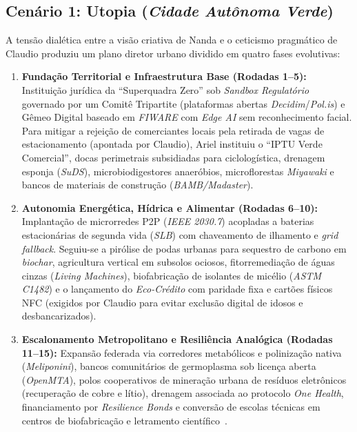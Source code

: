 \documentclass[runningheads]{llncs}
\begin{document}
\subsection{Cen\'ario 1: Utopia (\emph{Cidade Aut\^onoma Verde})}
A tens\~ao dial\'etica entre a vis\~ao criativa de Nanda e o ceticismo pragm\'atico de Claudio produziu um plano diretor urbano dividido em quatro fases evolutivas:

\begin{enumerate}
    \item \textbf{Funda\c{c}\~ao Territorial e Infraestrutura Base (Rodadas 1--5):} Instituição jur\'idica da ``Superquadra Zero'' sob \emph{Sandbox Regulat\'orio} governado por um Comit\^e Tripartite (plataformas abertas \emph{Decidim}/\emph{Pol.is}) e G\^emeo Digital baseado em \emph{FIWARE} com \emph{Edge AI} sem reconhecimento facial. Para mitigar a rejei\c{c}\~ao de comerciantes locais pela retirada de vagas de estacionamento (apontada por Claudio), Ariel instituiu o ``IPTU Verde Comercial'', docas perimetrais subsidiadas para ciclolog\'istica, drenagem esponja (\emph{SuDS}), microbiodigestores anaer\'obios, microflorestas \emph{Miyawaki} e bancos de materiais de constru\c{c}\~ao (\emph{BAMB/Madaster}).
    \item \textbf{Autonomia Energ\'etica, H\'idrica e Alimentar (Rodadas 6--10):} Implanta\c{c}\~ao de microrredes P2P (\emph{IEEE 2030.7}) acopladas a baterias estacion\'arias de segunda vida (\emph{SLB}) com chaveamento de ilhamento e \emph{grid fallback}. Seguiu-se a pir\'olise de podas urbanas para sequestro de carbono em \emph{biochar}, agricultura vertical em subsolos ociosos, fitorremedia\c{c}\~ao de \'aguas cinzas (\emph{Living Machines}), biofabrica\c{c}\~ao de isolantes de mic\'elio (\emph{ASTM C1482}) e o lan\c{c}amento do \emph{Eco-Cr\'edito} com paridade fixa e cart\~oes f\'isicos NFC (exigidos por Claudio para evitar exclus\~ao digital de idosos e desbancarizados).
    \item \textbf{Escalonamento Metropolitano e Resili\^encia Anal\'ogica (Rodadas 11--15):} Expans\~ao federada via corredores metab\'olicos e poliniza\c{c}\~ao nativa (\emph{Meliponini}), bancos comunit\'arios de germoplasma sob licen\c{c}a aberta (\emph{OpenMTA}), polos cooperativos de minera\c{c}\~ao urbana de res\'iduos eletr\^onicos (recupera\c{c}\~ao de cobre e l\'itio), drenagem associada ao protocolo \emph{One Health}, financiamento por \emph{Resilience Bonds} e convers\~ao de escolas t\'ecnicas em centros de biofabrica\c{c}\~ao e letramento cient\'ifico~\cite{misturini2018episodios,freitas2019termodinamica}.

\end{enumerate}
\end{document}
